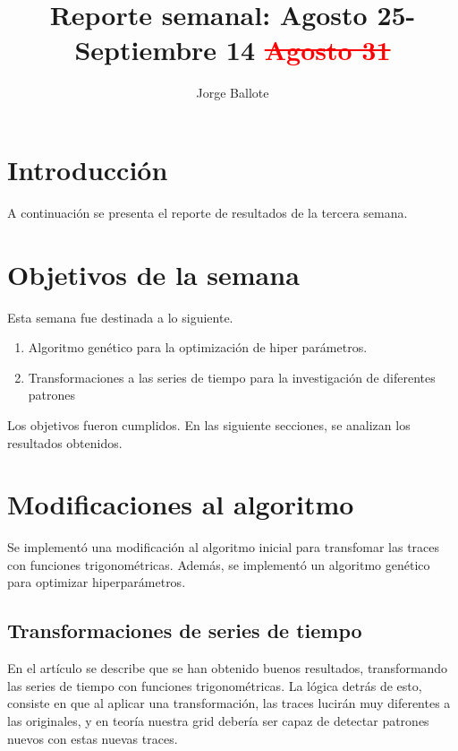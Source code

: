 \documentclass[11pt]{article}
\title{Reporte semanal: Agosto 25-Septiembre 14 \textcolor{red}{\st{Agosto 31}}}
\author{Jorge Ballote}
\begin{document}
% 
\maketitle
\section{Introducción} A continuación se presenta el reporte de resultados de la tercera semana.

\section{Objetivos de la semana}
Esta semana fue destinada a lo siguiente.
\begin{enumerate}
    \item Algoritmo genético para la optimización de hiper parámetros.
    \item Transformaciones a las series de tiempo para la investigación de diferentes patrones
\end{enumerate}
Los objetivos fueron cumplidos. En las siguiente secciones, se analizan los resultados obtenidos.

\section{Modificaciones al algoritmo}
Se implementó una modificación al algoritmo inicial para transfomar las traces con funciones trigonométricas. Además, se implementó un algoritmo genético para optimizar hiperparámetros.

\subsection{Transformaciones de series de tiempo}
En el artículo se describe que se han obtenido buenos resultados, transformando las series de tiempo con funciones trigonométricas. La lógica detrás de esto, consiste en que al aplicar una transformación, las traces lucirán muy diferentes a las originales, y en teoría nuestra grid debería ser capaz de detectar patrones nuevos con estas nuevas traces.
\end{document}
